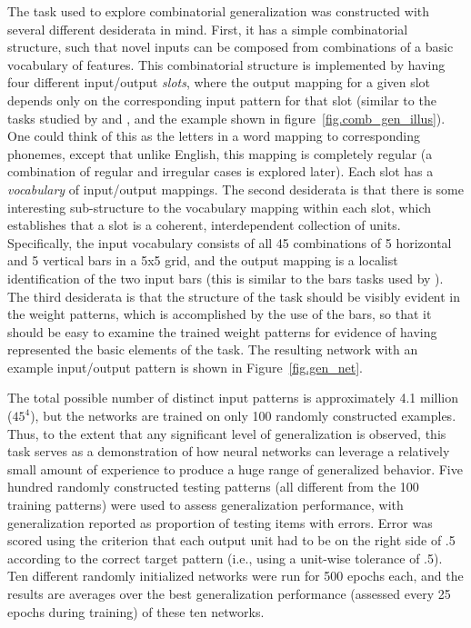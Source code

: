 \documentclass[12pt,twoside]{article}
\begin{document}
The task used to explore combinatorial generalization was constructed
with several different desiderata in mind.  First, it has a simple
combinatorial structure, such that novel inputs can be composed from
combinations of a basic vocabulary of features.  This combinatorial
structure is implemented by having four different input/output {\em
  slots}, where the output mapping for a given slot depends only on
the corresponding input pattern for that slot (similar to the tasks
studied by  and , and the
example shown in figure~\ref{fig.comb_gen_illus}).  One could think of
this as the letters in a word mapping to corresponding phonemes,
except that unlike English, this mapping is completely regular (a
combination of regular and irregular cases is explored later).  Each
slot has a {\em vocabulary} of input/output mappings.  The second
desiderata is that there is some interesting sub-structure to the
vocabulary mapping within each slot, which establishes that a slot is
a coherent, interdependent collection of units.  Specifically, the
input vocabulary consists of all 45 combinations of 5 horizontal and 5
vertical bars in a 5x5 grid, and the output mapping is a localist
identification of the two input bars (this is similar to the bars
tasks used by ).  The
third desiderata is that the structure of the task should be visibly
evident in the weight patterns, which is accomplished by the use of
the bars, so that it should be easy to examine the trained weight
patterns for evidence of having represented the basic elements of the
task.  The resulting network with an example input/output pattern is
shown in Figure~\ref{fig.gen_net}.

The total possible number of distinct input patterns is approximately
4.1 million ($45^4$), but the networks are trained on only 100
randomly constructed examples.  Thus, to the extent that any
significant level of generalization is observed, this task serves as a
demonstration of how neural networks can leverage a relatively small
amount of experience to produce a huge range of generalized behavior.
Five hundred randomly constructed testing patterns (all different from
the 100 training patterns) were used to assess generalization
performance, with generalization reported as proportion of testing
items with errors.  Error was scored using the criterion that each
output unit had to be on the right side of .5 according to the correct
target pattern (i.e., using a unit-wise tolerance of .5).  Ten different
randomly initialized networks were run for 500 epochs each, and the
results are averages over the best generalization performance
(assessed every 25 epochs during training) of these ten networks.
\end{document}
